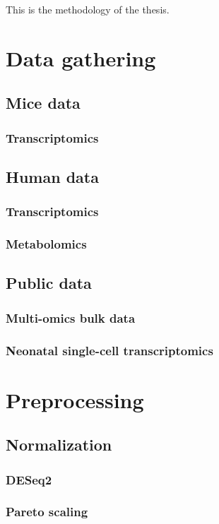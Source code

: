 This is the methodology of the thesis.

\section{Data gathering}
    \subsection{Mice data}
        \subsubsection{Transcriptomics}
    \subsection{Human data}
        \subsubsection{Transcriptomics}
        \subsubsection{Metabolomics}
    \subsection{Public data}
        \subsubsection{Multi-omics bulk data}
        \subsubsection{Neonatal single-cell transcriptomics}
        
\section{Preprocessing}
    \subsection{Normalization}
        \subsubsection{DESeq2}
        \subsubsection{Pareto scaling}
